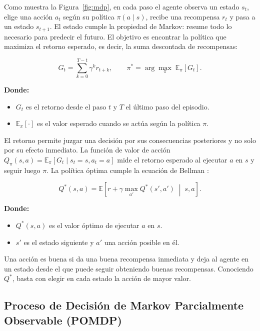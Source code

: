 Como muestra la Figura~\ref{fig:mdp}, en cada paso el agente observa un estado $s_t$, elige
una acción $a_t$ según su política $\pi(a \mid s)$, recibe una recompensa $r_t$ y pasa a un
estado $s_{t+1}$. El estado cumple la propiedad de Markov: resume todo lo necesario para
predecir el futuro. El objetivo es encontrar la política que maximiza el retorno esperado,
es decir, la suma descontada de recompensas:

\begin{equation}
    G_t = \sum_{k=0}^{T-t} \gamma^k r_{t+k},
    \qquad
    \pi^* = \arg\max_{\pi} \; \mathbb{E}_{\pi}\!\left[G_t\right].
    \label{eq:return}
\end{equation}

\noindent\textbf{Donde:}
\begin{itemize}
    \item $G_t$ es el retorno desde el paso $t$ y $T$ el último paso del episodio.
    \item $\mathbb{E}_{\pi}[\cdot]$ es el valor esperado cuando se actúa según la política $\pi$.
\end{itemize}

El retorno permite juzgar una decisión por sus consecuencias posteriores y no solo por su
efecto inmediato. La función de valor de acción $Q_\pi(s,a) = \mathbb{E}_\pi[G_t \mid
s_t=s, a_t=a]$ mide el retorno esperado al ejecutar $a$ en $s$ y seguir luego $\pi$. La
política óptima cumple la ecuación de Bellman \cite{sutton2018rl}:

\begin{equation}
    Q^*(s,a) = \mathbb{E}\!\left[r + \gamma \max_{a'} Q^*(s',a') \;\middle|\; s,a\right].
    \label{eq:bellman_optimality}
\end{equation}

\noindent\textbf{Donde:}
\begin{itemize}
    \item $Q^*(s,a)$ es el valor óptimo de ejecutar $a$ en $s$.
    \item $s'$ es el estado siguiente y $a'$ una acción posible en él.
\end{itemize}

Una acción es buena si da una buena recompensa inmediata y deja al agente en un estado
desde el que puede seguir obteniendo buenas recompensas. Conociendo $Q^*$, basta con elegir
en cada estado la acción de mayor valor.

\subsection{Proceso de Decisión de Markov Parcialmente Observable (POMDP)}
\label{sec:pomdp}

